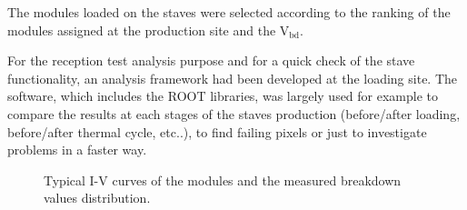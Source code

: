 
The modules loaded on the staves were selected according to the ranking of the modules assigned at the production site and the V$_{\mathrm{bd}}$.

For the reception test analysis purpose and for a quick check of the stave functionality, an analysis framework had been developed at the loading site. The software, which includes the ROOT libraries, was largely used for example to compare the results at each stages of the staves production (before/after loading, before/after thermal cycle, etc..), to find failing pixels or just to investigate problems in a faster way. 

\begin{figure}
      	\centering
	\null\hfill
	\hfill
	\hfill\null
        \caption{Typical I-V curves of the modules and the measured breakdown values distribution.}
        \label{figure:IVDistro}
\end{figure}

